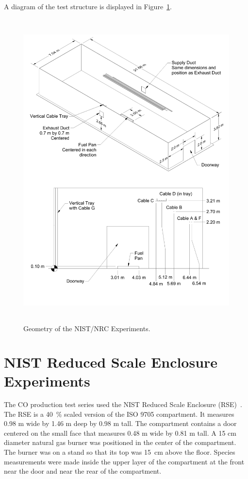 A diagram of the test structure is displayed in Figure~\ref{NIST_NRC_Drawing}.

\begin{figure}
\begin{center}
\includegraphics[height=6.5in]{FIGURES/NIST_NRC/NIST_NRC_Drawing}
\end{center}
\caption{Geometry of the NIST/NRC Experiments.}
\label{NIST_NRC_Drawing}
\end{figure}


\clearpage


\section{NIST Reduced Scale Enclosure Experiments}

The CO production test series used the NIST Reduced Scale Enclosure (RSE)~\cite{Bryner:1}.  The RSE is a
40~\% scaled version of the ISO 9705 compartment.
It measures 0.98 m wide by 1.46 m deep by 0.98 m tall.  The compartment contains a door centered on the small
face that measures 0.48 m wide by 0.81 m tall.  A 15 cm diameter natural gas burner was positioned in the
center of the compartment.  The burner was on a stand so that its top was 15~cm above the floor.
Species measurements were made inside the upper layer of the compartment at the front near the door
and near the rear of the compartment.



